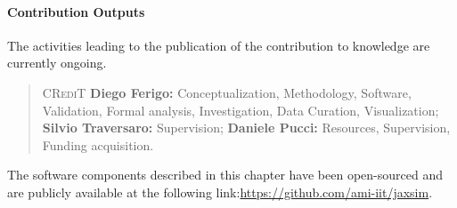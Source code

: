 \paragraph{Contribution Outputs}

The activities leading to the publication of the contribution to knowledge are currently ongoing.
%
\begin{quote}
    \textsc{CRediT} \hspace{2mm}
    \textbf{Diego Ferigo:} Conceptualization, Methodology, Software, Validation, Formal analysis, Investigation, Data Curation, Visualization;
    \textbf{Silvio Traversaro:} Supervision;
    \textbf{Daniele Pucci:} Resources, Supervision, Funding acquisition.
\end{quote}
%
The software components described in this chapter have been open-sourced and are publicly available at the following link:\linebreak \url{https://github.com/ami-iit/jaxsim}.
